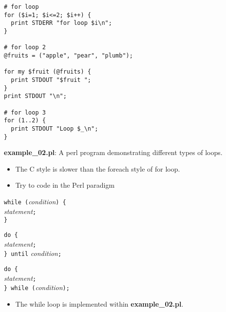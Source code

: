 \documentclass[17pt,dvips]{foils}
\begin{document}



\begin{verbatim}
# for loop
for ($i=1; $i<=2; $i++) {
  print STDERR "for loop $i\n";
}

# for loop 2
@fruits = ("apple", "pear", "plumb");

for my $fruit (@fruits) {
  print STDOUT "$fruit ";
}
print STDOUT "\n";

# for loop 3
for (1..2) {
  print STDOUT "Loop $_\n";
}
\end{verbatim}
{\bf example\_02.pl}: A perl program demonstrating different types of loops.


\begin{itemize}
\item The C style is slower than the foreach style of for loop.
\item Try to code in the Perl paradigm
\end{itemize}



\noindent \texttt{while (}{\em condition}\texttt{) \{}\\
{\em statement}\texttt{;\\
\}}

\noindent \texttt{do \{}\\
{\em statement}\texttt{;\\
\} until} {\em condition}\texttt{;}

\noindent \texttt{do \{}\\
{\em statement}\texttt{;\\
\} while (}{\em condition}\texttt{);}

\begin{itemize}
\item The while loop is implemented within {\bf example\_02.pl}.
\end{itemize}
\end{document}
